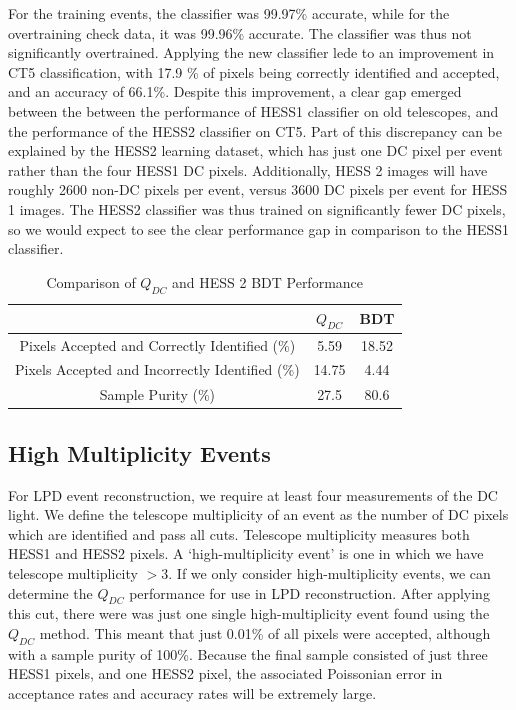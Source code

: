\documentclass{article}
\begin{document}
For the training events, the classifier was 99.97\% accurate, while for the overtraining check data, it was 99.96\% accurate. The classifier was thus not significantly overtrained. Applying the new classifier lede to an improvement in CT5 classification, with 17.9 \% of pixels being correctly identified and accepted, and an accuracy of 66.1\%. Despite this improvement, a clear gap emerged between the between the performance of HESS1 classifier on old telescopes, and the performance of the HESS2 classifier on CT5. Part of this discrepancy can be explained by the HESS2 learning dataset, which has just one DC pixel per event rather than the four HESS1 DC pixels. Additionally, HESS 2 images will have roughly 2600 non-DC pixels per event, versus 3600 DC pixels per event for HESS 1 images. The HESS2 classifier was thus trained on significantly fewer DC pixels, so we would expect to see the clear performance gap in comparison to the HESS1 classifier.  

\begin{table}[h!]
  \centering
  \caption{Comparison of $Q_{DC}$ and HESS 2 BDT Performance}
  \label{tab:qdcbdtcomparison2}
  \begin{tabular}{ccc}
    \toprule
    & $Q_{DC}$ & BDT\\
    \midrule
    Pixels Accepted and Correctly Identified (\%) & 5.59 & 18.52 \\
   Pixels Accepted and Incorrectly Identified (\%) & 14.75 & 4.44 \\
    Sample Purity (\%) & 27.5 & 80.6 \\
    \bottomrule
  \end{tabular}
\end{table}

\subsection{High Multiplicity Events}
For LPD event reconstruction, we require at least four measurements of the DC light. We define the telescope multiplicity of an event as the number of DC pixels which are identified and pass all cuts. Telescope multiplicity measures both HESS1 and HESS2 pixels. A \textquoteleft high-multiplicity event' is one in which we have telescope multiplicity $>3$. If we only consider high-multiplicity events, we can determine the $Q_{DC}$ performance for use in LPD reconstruction. After applying this cut, there were was just one single high-multiplicity event found using the $Q_{DC}$ method. This meant that just 0.01\% of all pixels were accepted, although with a sample purity of 100\%. Because the final sample consisted of just three HESS1 pixels, and one HESS2 pixel, the associated Poissonian error in acceptance rates and accuracy rates will be extremely large.
\end{document}
